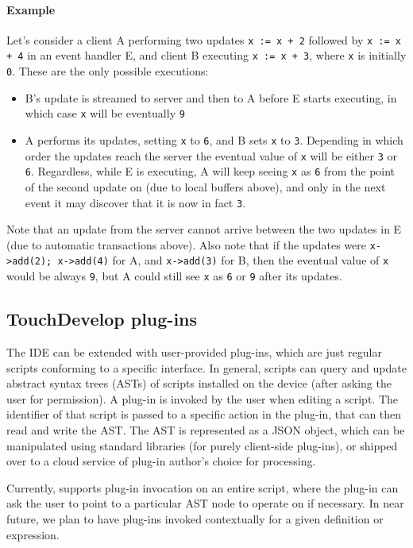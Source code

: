 \documentclass[preprint]{sigplanconf}
\begin{document}
\paragraph{Example}
Let's consider a client A performing two updates \texttt{x := x + 2} followed by \texttt{x := x + 4} in an event handler E, and client
B executing \texttt{x := x + 3}, where \texttt{x} is initially \texttt{0}.
These are the only possible executions:
\begin{itemize}
\item B's update is streamed to server and then to A before E starts executing,
in which case \texttt{x} will be eventually \texttt{9}
\item A performs its updates, setting \texttt{x} to \texttt{6}, and B sets
\texttt{x} to \texttt{3}. Depending in which order the updates reach the server
the eventual value of \texttt{x} will be either \texttt{3} or \texttt{6}.
Regardless, while E is executing, A will keep seeing \texttt{x} as \texttt{6}
from the point of the second update on
(due to local buffers above), and only in the next event it may discover that
it is now in fact \texttt{3}.
\end{itemize}
Note that an update from the server cannot arrive between the two updates in E (due to automatic transactions above).
Also note that if the updates were \texttt{x->add(2); x->add(4)} for A, and \texttt{x->add(3)} for B, then
the eventual value of \texttt{x} would be always \texttt{9}, but A could still see \texttt{x} as
\texttt{6} or \texttt{9} after its updates.

\subsection{TouchDevelop plug-ins}

The \TD IDE can be extended with user-provided plug-ins, which are just regular \TD scripts
conforming to a specific interface.
In general, \TD scripts can query and update abstract syntax trees (ASTs) of scripts installed
on the device (after asking the user for permission).
A plug-in is invoked by the user when editing a script.
The identifier of that script is passed to a specific action in the plug-in,
that can then read and write the AST.
The AST is represented as a JSON object, which can be manipulated using standard \TD libraries
(for purely client-side plug-ins),
or shipped over to a cloud service of plug-in author's choice for processing.

Currently, \TD supports plug-in invocation on an entire script, where the plug-in can ask the user
to point to a particular AST node to operate on if necessary.
In near future, we plan to have plug-ins invoked contextually for a given definition
or expression.
\end{document}
